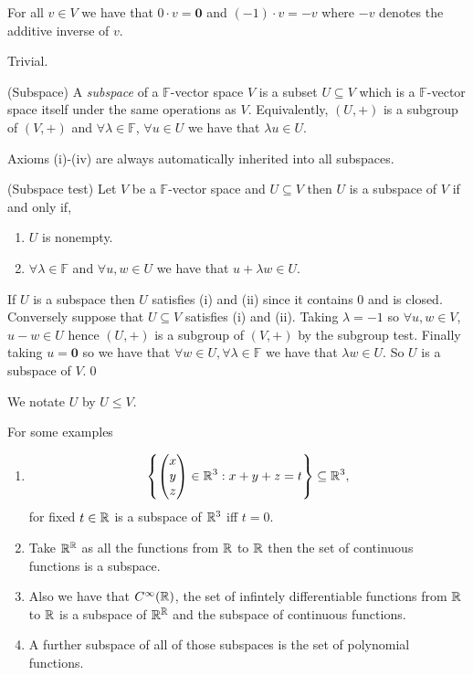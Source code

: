 \documentclass{article}
\newcommand{\F}{\mathbb{F}}
\begin{document}
\begin{proposition}
  For all $ v\in V $ we have that $ 0\cdot v = \boldsymbol 0 $ and $ (-1)\cdot v=-v $ where $ -v $ denotes the additive inverse of $ v $.
\end{proposition}
\pf Trivial.
\begin{definition}
	(Subspace) A \textit{subspace} of a $ \F $-vector space $ V $ is a subset $ U\subseteq V $ which is a $ \F $-vector space itself under the same operations as $ V $. Equivalently, $ (U,+) $ is a subgroup of $ (V,+) $ and $ \forall \lambda\in \F $, $\forall u\in U $ we have that $ \lambda u \in U $.
\end{definition}
\begin{remark}
  Axioms (i)-(iv) are always automatically inherited into all subspaces.
\end{remark}
\begin{proposition}
	(Subspace test) Let $ V $ be a $ \F $-vector space and $ U\subseteq V $ then $ U $ is a subspace of $ V $ if and only if,
	\begin{enumerate}
		\item $ U $ is nonempty.
		\item $ \forall \lambda\in\F $ and $ \forall u,w\in U $ we have that $ u+\lambda w \in U $.
	\end{enumerate}
\end{proposition}
\pf If $ U $ is a subspace then $ U $ satisfies (i) and (ii) since it contains $ 0 $ and is closed. Conversely suppose that $ U\subseteq V $ satisfies (i) and (ii). Taking $ \lambda = -1 $ so $ \forall u,w\in V $, $ u-w\in U $ hence $ (U,+) $ is a subgroup of $ (V,+) $ by the subgroup test. Finally taking $ u=\boldsymbol 0 $ so we have that $ \forall w\in U,\forall\lambda\in \F $ we have that $ \lambda w\in U $. So $ U $ is a subspace of $ V $.\qed\par
We notate $ U $ by $ U\le V $.\par
For some examples
\begin{enumerate}
	\item \[
	\left\{\begin{pmatrix}
			x \\
			y \\
			z \\
	\end{pmatrix}\in \mathbb{R}^3:x+y+z=t\right\}\subseteq \mathbb{R}^3, 
\]
for fixed $ t\in \mathbb{R} $ is a subspace of $ \mathbb{R}^3 $ iff $ t = 0 $.\par
\item Take $ \mathbb{R}^{\mathbb{R}} $ as all the functions from $ \mathbb{R} $ to $ \mathbb{R} $ then the set of continuous functions is a subspace.
\item Also we have that $ C^\infty(\mathbb{R}) $, the set of infintely differentiable functions from $ \mathbb{R} $ to $ \mathbb{R} $ is a subspace of $ \mathbb{R}^{\mathbb{R}} $ and the subspace of continuous functions.
\item A further subspace of all of those subspaces is the set of polynomial functions.
\end{enumerate}
\end{document}
